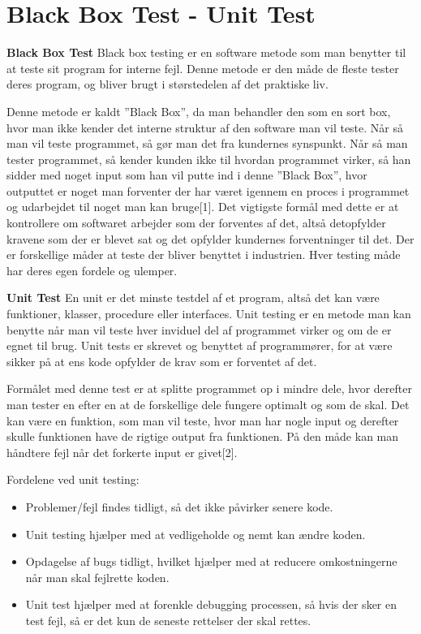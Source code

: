 \section{Black Box Test - Unit Test}\label{Test}
\textbf{Black Box Test} \newline
Black box testing er en software metode som man benytter til at teste sit program for interne fejl. Denne metode er den måde de fleste tester deres program, og bliver brugt i størstedelen af det praktiske liv. 

\vspace {5mm}

Denne metode er kaldt ”Black Box”, da man behandler den som en sort box, hvor man ikke kender det interne struktur af den software man vil teste. Når så man vil teste programmet, så gør man det fra kundernes synspunkt. Når så man tester programmet, så kender kunden ikke til hvordan programmet virker, så han sidder med noget input som han vil putte ind i denne ”Black Box”, hvor outputtet er noget man forventer der har været igennem en proces i programmet og udarbejdet til noget man kan bruge[1]. Det vigtigste formål med dette er at kontrollere om softwaret arbejder som der forventes af det, altså detopfylder kravene som der er blevet sat og det opfylder kundernes forventninger til det.
Der er forskellige måder at teste der bliver benyttet i industrien. Hver testing måde har deres egen fordele og ulemper.
\vspace {5mm}

\textbf{Unit Test} \newline
En unit er det minste testdel af et program, altså det kan være funktioner, klasser, procedure eller interfaces. Unit testing er en metode man kan benytte når man vil teste hver inviduel del af programmet virker og om de er egnet til brug. Unit tests er skrevet og benyttet af programmører, for at være sikker på at ens kode opfylder de krav som er forventet af det. 

\vspace {5mm}

Formålet med denne test er at splitte programmet op i mindre dele, hvor derefter man tester en efter en at de forskellige dele fungere optimalt og som de skal. Det kan være en funktion, som man vil teste, hvor man har nogle input og derefter skulle funktionen have de rigtige output fra funktionen. På den måde kan man håndtere fejl når det forkerte input er givet[2].

\vspace {5mm}

Fordelene ved unit testing:
\begin{itemize}
\item Problemer/fejl findes tidligt, så det ikke påvirker senere kode.
\item Unit testing hjælper med at vedligeholde og nemt kan ændre koden.
\item Opdagelse af bugs tidligt, hvilket hjælper med at reducere omkostningerne når man skal fejlrette koden.
\item Unit test hjælper med at forenkle debugging processen, så hvis der sker en test fejl, så er det kun de seneste rettelser der skal rettes.
\end{itemize}

